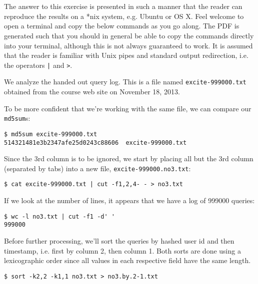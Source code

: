 
\section{}

\label{appendix:1}

The answer to this exercise is presented in such a manner that the reader can
reproduce the results on a *nix system, e.g. Ubuntu or OS X. Feel welcome to
open a terminal and copy the below commands as you go along. The PDF is
generated such that you should in general be able to copy the commands directly
into your terminal, although this is not always guaranteed to work. It is
assumed that the reader is familiar with Unix pipes and standard output
redirection, i.e. the operators \texttt{|} and \texttt{>}.

We analyze the handed out query log. This is a file named
\texttt{excite-999000.txt} obtained from the course web site on November 18,
2013.

To be more confident that we're working with the same file, we can compare our
\texttt{md5sum}s:

\begin{lstlisting}
$ md5sum excite-999000.txt
514321481e3b2347afe25d0243c88606  excite-999000.txt
\end{lstlisting}

Since the 3rd column is to be ignored, we start by placing all but the 3rd
column (separated by tabs) into a new file, \texttt{excite-999000.no3.txt}:

\begin{lstlisting}
$ cat excite-999000.txt | cut -f1,2,4- - > no3.txt
\end{lstlisting}

If we look at the number of lines, it appears that we have a log of 999000
queries:

\begin{lstlisting}
$ wc -l no3.txt | cut -f1 -d' '
999000
\end{lstlisting}

Before further processing, we'll sort the queries by hashed user id and then
timestamp, i.e. first by column 2, then column 1. Both sorts are done using a
lexicographic order since all values in each respective field have the same
length.

\begin{lstlisting}
$ sort -k2,2 -k1,1 no3.txt > no3.by.2-1.txt
\end{lstlisting}


